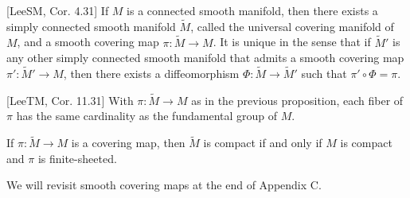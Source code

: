 \begin{proposition}
\label{prop:universal-covering-manifold}
[LeeSM, Cor. 4.31] If $M$ is a connected smooth manifold, then there exists a simply connected smooth manifold $\tilde{M}$, called the universal covering manifold of $M$, and a smooth covering map $\pi: \tilde{M} \to M$. It is unique in the sense that if $\tilde{M}'$ is any other simply connected smooth manifold that admits a smooth covering map $\pi': \tilde{M}' \to M$, then there exists a diffeomorphism $\Phi: \tilde{M} \to \tilde{M}'$ such that $\pi' \circ \Phi = \pi$.
\end{proposition}

\begin{proposition}
\label{prop:fiber-cardinality-fundamental-group}
[LeeTM, Cor. 11.31] With $\pi: \tilde{M} \to M$ as in the previous proposition, each fiber of $\pi$ has the same cardinality as the fundamental group of $M$.
\end{proposition}

\begin{proposition}
\label{prop:compact-covering-finite-sheeted}
If $\pi:\tilde M\to M$ is a covering map, then $\tilde M$ is compact if and
only if $M$ is compact and $\pi$ is finite-sheeted.
\end{proposition}

We will revisit smooth covering maps at the end of Appendix C.

